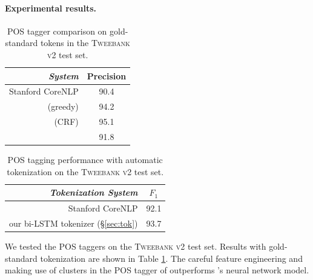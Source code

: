 \documentclass[11pt,a4paper]{article}
\begin{document}
\paragraph{Experimental results.}

\begin{table}[t]
	\centering
	\begin{tabular}{rc}
		\hline
		\it System & Precision \\
		\hline
		Stanford CoreNLP & 90.4 \\
		\citealp{owoputi-EtAl:2013:NAACL-HLT} (greedy) & 94.2 \\
		\citealp{owoputi-EtAl:2013:NAACL-HLT} (CRF) & 95.1 \\
		\hdashline
		\citealp{ma-hovy:2016:P16-1} & 91.8 \\
		\hline
	\end{tabular}
	\caption{POS tagger comparison on gold-standard tokens in the
          \textsc{Tweebank v2} test set. \label{tbl:pos-result}}
\end{table}

\begin{table}[t]
	\centering
	\begin{tabular}{rc}
		\hline
		\it Tokenization System & $F_1$ \\
		\hline
		Stanford CoreNLP & 92.1 \\
		our bi-LSTM tokenizer (\S\ref{sec:tok}) & 93.7 \\
		\hline
	\end{tabular}
	\caption{\citet{owoputi-EtAl:2013:NAACL-HLT} POS tagging performance with automatic tokenization on
          the \textsc{Tweebank v2} test set. \label{tbl:pos-result-vs-tok}}
\end{table}

We tested the POS taggers on the \textsc{Tweebank v2} test set.  Results
with gold-standard tokenization are shown in
Table \ref{tbl:pos-result}. The careful feature engineering and making use of
\citet{Brown:1992:CNG:176313.176316} clusters in the 
POS tagger of \citet{owoputi-EtAl:2013:NAACL-HLT} outperforms \citet{ma-hovy:2016:P16-1}'s neural network
model. 
\end{document}
